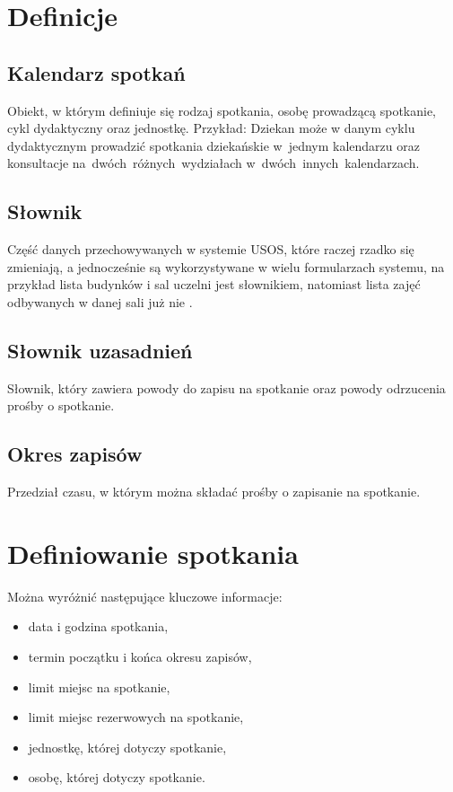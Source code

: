 \documentclass[licencjacka]{pracamgr}
\begin{document}
\section{Definicje}
\subsection{Kalendarz spotkań}
Obiekt, w którym definiuje się rodzaj spotkania, osobę prowadzącą spotkanie, cykl dydaktyczny oraz jednostkę. Przykład: Dziekan może w danym cyklu dydaktycznym prowadzić spotkania dziekańskie w~jednym kalendarzu oraz konsultacje na~dwóch~różnych~wydziałach w~dwóch~innych~kalendarzach.

\subsection{Słownik}
Część danych  przechowywanych  w  systemie  USOS, które  raczej  rzadko się zmieniają, a  jednocześnie są wykorzystywane w wielu formularzach systemu, na przykład lista budynków i sal uczelni jest słownikiem, natomiast lista zajęć odbywanych w danej sali już nie \cite{prz}.

\subsection{Słownik uzasadnień}
Słownik, który zawiera powody do zapisu na spotkanie oraz powody odrzucenia prośby o spotkanie.

\subsection{Okres zapisów}
Przedział czasu, w którym można składać prośby o zapisanie na spotkanie.


\section{Definiowanie spotkania}
Można wyróżnić następujące kluczowe informacje:

\begin{itemize}
\setlength\itemsep{0,05em}
    \item data i godzina spotkania,
    \item termin początku i końca okresu zapisów,
    \item limit miejsc na spotkanie,
    \item limit miejsc rezerwowych na spotkanie,
    \item jednostkę, której dotyczy spotkanie,
    \item osobę, której dotyczy spotkanie.
\end{itemize}
\end{document}
